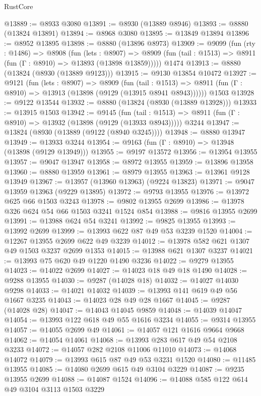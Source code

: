 \begin{lexlean}{RustCore}
\begin{coremodule}
@13889 := @8933 @3080
@13891 := @8930 (@13889 @8946)
@13893 := @8880 (@13824 @13891)
@13894 := @8968 @3080
@13895 := @13849 @13894
@13896 := @8952 @13895
@13898 := @8880 (@13896 @8973)
@13909 := @9099
    (fun (rty : @1486) =>
    @8908
      (fun (lets : @8907) =>
      @8909 (fun (tail : @1513) => @8911 (fun (Γ : @8910) => @13893 (@13898 @13859)))))
    @1474
@13913 := @8880 (@13824 (@8930 (@13889 @9123)))
@13915 := @9130 @13854 @10472
@13927 := @9121
    (fun (lets : @8907) =>
    @8909
      (fun (tail : @1513) =>
      @8911 (fun (Γ : @8910) => @13913 (@13898 (@9129 (@13915 @8941 @8943))))))
    @1503
@13928 := @9122 @13544
@13932 := @8880 (@13824 (@8930 (@13889 @13928)))
@13933 := @13915 @1503
@13942 := @9145
    (fun (tail : @1513) => @8911 (fun (Γ : @8910) => @13932 (@13898 (@9129 (@13933 @8943)))))
    @3244
@13947 := @13824 (@8930 (@13889 (@9122 (@8940 @3245))))
@13948 := @8880 @13947
@13949 := @13933 @3244
@13954 := @9163 (fun (Γ : @8910) => @13948 (@13898 (@9129 @13949)))
@13955 := @9197 @13572
@13956 := @13954 @13955
@13957 := @9047 @13947
@13958 := @8972 @13955
@13959 := @13896 @13958
@13960 := @8880 @13959
@13961 := @8979 @13955
@13963 := @13961 @9128 @13949
@13967 := @13957 (@13960 @13963) (@9224 @13823)
@13971 := @9047 @13959 @13963 (@9229 @13895)
@13972 := @9793 @13955
@13976 := @13972 @625 @66 @1503 @3243
@13978 := @9802 @13955 @2699
@13986 := @13978 @326 @624 @54 @66 @1503 @3241 @1524 @854
@13988 := @9816 @13955 @2699
@13991 := @13988 @624 @54 @3241
@13992 := @9825 @13955
@13993 := @13992 @2699
@13999 := @13993 @622 @87 @49 @53 @3239 @1520
@14004 := @12267 @13955 @2699 @622 @49 @3239
@14012 := @13978 @582 @621 @1307 @49 @1503 @3237 @2699 @1353
@14015 := @13988 @621 @1307 @3237
@14021 := @13993 @75 @620 @49 @1220 @1490 @3236
@14022 := @9279 @13955
@14023 := @14022 @2699
@14027 := @14023 @18 @49 @18 @1490
@14028 := @9288 @13955
@14030 := @9287 (@14028 @18)
@14032 := @14027 @14030 @9298
@14033 := @14021 @14032
@14039 := @13993 @141 @619 @49 @56 @1667 @3235
@14043 := @14023 @28 @49 @28 @1667
@14045 := @9287 (@14028 @28)
@14047 := @14043 @14045 @9859
@14048 := @14039 @14047
@14054 := @13993 @122 @618 @49 @55 @1616 @3234
@14055 := @9314 @13955
@14057 := @14055 @2699 @49
@14061 := @14057 @121 @1616 @9664 @9668
@14062 := @14054 @14061
@14068 := @13993 @283 @617 @49 @54 @2108 @3233
@14072 := @14057 @282 @2108 @11006 @11010
@14073 := @14068 @14072
@14079 := @13993 @615 @87 @49 @53 @3231 @1520
@14080 := @11485 @13955
@14085 := @14080 @2699 @615 @49 @3104 @3229
@14087 := @9235 @13955 @2699
@14088 := @14087 @1524
@14096 := @14088 @585 @122 @614 @49 @3104 @3113 @1503 @3229

\end{coremodule}
\end{lexlean}
